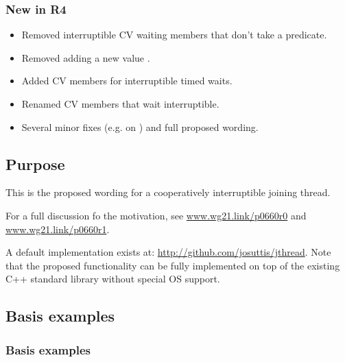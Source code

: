 \subsubsection*{New in R4}
\begin{itemize}
 \item Removed interruptible CV waiting members that don't take a predicate.
 \item Removed adding a new  value .
 \item Added CV members for interruptible timed waits.
 \item Renamed CV members that wait interruptible.
 \item Several minor fixes (e.g. on ) and full proposed wording.
\end{itemize}

\subsection*{Purpose}

This is the proposed wording for a cooperatively interruptible joining thread.

For a full discussion fo the motivation, see
\url{www.wg21.link/p0660r0} and
\url{www.wg21.link/p0660r1}.

A default implementation exists at:
\url{http://github.com/josuttis/jthread}.
Note that the proposed functionality can be fully implemented 
on top of the existing C++ standard library without special OS support.

\subsection*{Basis examples}

\subsubsection*{Basis  examples}

